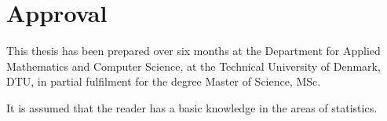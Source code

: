 \section*{Approval}
This thesis has been prepared over six months at the Department for Applied Mathematics and Computer Science, at the Technical University of Denmark, DTU, in partial fulfilment for the degree Master of Science, MSc.

It is assumed that the reader has a basic knowledge in the areas of statistics. 

\vfill

\begin{center}
\namesigdate{\thesisauthor~-~\studentnumber}
\end{center}

\vfill

